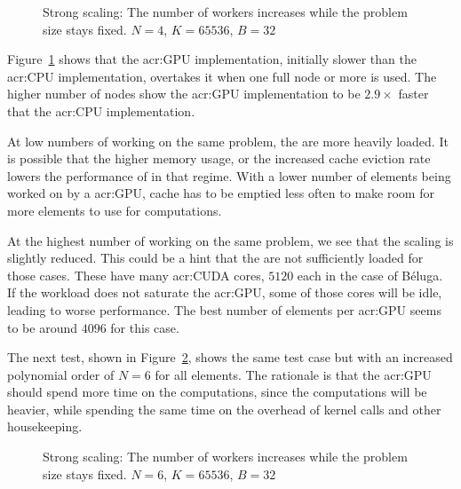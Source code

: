 \begin{figure}[H]
    \centering
    
    \caption{Strong scaling: The number of workers increases while the problem size stays fixed. \(N
        = 4\), \(K = 65536\), \(B = 32\)}\label{fig:strong_scaling_N4_W32}
\end{figure}

Figure~\ref{fig:strong_scaling_N4_W32} shows that the \acrshort{acr:GPU} implementation, initially
slower than the \acrshort{acr:CPU} implementation, overtakes it when one full node or more is used.
The higher number of nodes show the \acrshort{acr:GPU} implementation to be \(2.9 \times \) faster
that the \acrshort{acr:CPU} implementation.

At low numbers of  working on the same problem, the  are
more heavily loaded. It is possible that the higher memory usage, or the increased cache eviction
rate lowers the performance of  in that regime. With a lower number of elements
being worked on by a \acrshort{acr:GPU}, cache has to be emptied less often to make room for more
elements to use for computations.

At the highest number of  working on the same problem, we see that the scaling
is slightly reduced. This could be a hint that the  are not sufficiently loaded
for those cases. These  have many \acrshort{acr:CUDA} cores, \(5120\) each in
the case of Béluga. If the workload does not saturate the \acrshort{acr:GPU}, some of those cores
will be idle, leading to worse performance. The best number of elements per \acrshort{acr:GPU} seems
to be around \(4096\) for this case.

The next test, shown in Figure~\ref{fig:strong_scaling_N6_W32}, shows the same test case but with an
increased polynomial order of \(N = 6\) for all elements. The rationale is that the
\acrshort{acr:GPU} should spend more time on the computations, since the computations will be
heavier, while spending the same time on the overhead of kernel calls and other housekeeping.

\begin{figure}[H]
    \centering
    
    \caption{Strong scaling: The number of workers increases while the problem size stays fixed. \(N
        = 6\), \(K = 65536\), \(B = 32\)}\label{fig:strong_scaling_N6_W32}
\end{figure}

